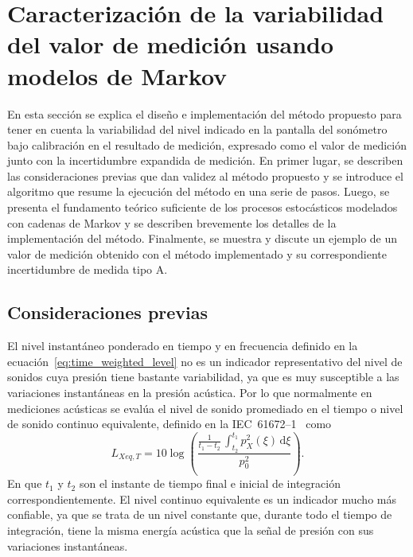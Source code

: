 
\chapter{Caracterización de la variabilidad del valor de medición usando modelos de Markov}

En esta sección se explica el diseño e implementación del método propuesto para tener en cuenta la variabilidad del
nivel indicado en la pantalla del sonómetro bajo calibración en el resultado de medición, expresado como el valor de
medición junto con la incertidumbre expandida de medición.
En primer lugar, se describen las consideraciones previas que dan validez al método propuesto y se introduce el
algoritmo que resume la ejecución del método en una serie de pasos.
Luego, se presenta el fundamento teórico suficiente de los procesos estocásticos modelados con cadenas de Markov y se
describen brevemente los detalles de la implementación del método.
Finalmente, se muestra y discute un ejemplo de un valor de medición obtenido con el método implementado y su
correspondiente incertidumbre de medida tipo A\@.

\section*{Consideraciones previas}
El nivel instantáneo ponderado en tiempo y en frecuencia definido en la ecuación~\eqref{eq:time_weighted_level} no es
un indicador representativo del nivel de sonidos cuya presión tiene bastante variabilidad, ya que es muy susceptible a
las variaciones instantáneas en la presión acústica.
Por lo que normalmente en mediciones acústicas se evalúa el nivel de sonido promediado en el tiempo o nivel de sonido
continuo equivalente, definido en la
\mbox{IEC 61672--1}~\citeyearpar{IEC_TC29_2013_1} como
%
\begin{equation}
    \label{eq:equivalent_level}
    L_{Xeq,T} = 10\log{\left(\frac{\frac{1}{t_1 - t_2}\,\int_{t_2}^{t_1} p_X^2\left(\xi\right)\,\mathrm{d}\xi}{p_0^2}\right)}.
\end{equation}
%
En que $t_1$ y $t_2$ son el instante de tiempo final e inicial de integración correspondientemente.
El nivel continuo equivalente es un indicador mucho más confiable, ya que se trata de un nivel constante que, durante
todo el tiempo de integración, tiene la misma energía acústica que la señal de presión con sus variaciones instantáneas.

